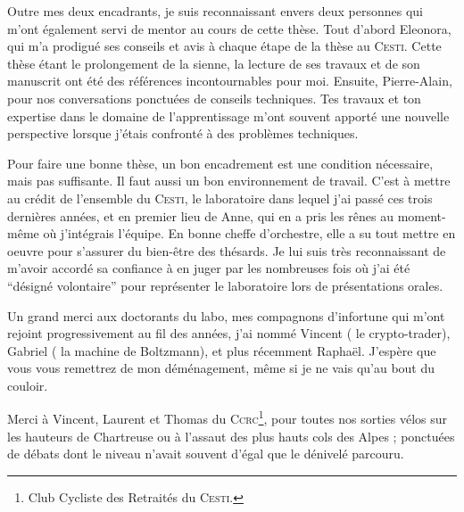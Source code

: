 Outre mes deux encadrants, je suis reconnaissant envers deux personnes qui m'ont également servi de mentor au cours de cette thèse.
Tout d'abord Eleonora, qui m'a prodigué ses conseils et avis à chaque étape de la thèse au \textsc{Cesti}.
Cette thèse étant le prolongement de la sienne, la lecture de ses travaux et de son manuscrit ont été des références incontournables pour moi.
Ensuite, Pierre-Alain, pour nos conversations ponctuées de conseils techniques.
Tes travaux et ton expertise dans le domaine de l'apprentissage m'ont souvent apporté une nouvelle perspective lorsque j'étais confronté à des problèmes techniques.

Pour faire une bonne thèse, un bon encadrement est une condition nécessaire, mais pas suffisante.
Il faut aussi un bon environnement de travail.
C'est à mettre au crédit de l'ensemble du \textsc{Cesti}, le laboratoire dans lequel j'ai passé ces trois dernières années, et en premier lieu de Anne, qui en a pris les rênes au moment-même où j'intégrais l'équipe.
En bonne cheffe d'orchestre, elle a su tout mettre en oeuvre pour s'assurer du bien-être des thésards.
Je lui suis très reconnaissant de m'avoir accordé sa confiance à en juger par les nombreuses fois où j'ai été ``désigné volontaire'' pour représenter le laboratoire lors de présentations orales.

Un grand merci aux doctorants du labo, mes compagnons d'infortune qui m'ont rejoint progressivement au fil des années, j'ai nommé Vincent (\aka{} le crypto-trader), Gabriel (\aka{} la machine de Boltzmann), et plus récemment Raphaël.
J'espère que vous vous remettrez de mon déménagement, même si je ne vais qu'au bout du couloir.

Merci à Vincent, Laurent et Thomas du \textsc{Ccrc}\footnote{Club Cycliste des Retraités du \textsc{Cesti}.}, pour toutes nos sorties vélos sur les hauteurs de Chartreuse ou à l'assaut des plus hauts cols des Alpes ; ponctuées de débats dont le niveau n'avait souvent d'égal que le dénivelé parcouru.

